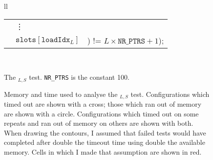 \begin{figure}
{{\begin{tabular}{ll}
\begin{tabular}{lll}
         & \vdots \\
         &\hspace{-4mm}$\texttt{slots}[\texttt{loadIdx}_L]$ &\hspace{-3mm}) != $L{\times}\texttt{NR\_PTRS} + 1$);\\
       \end{tabular}\\
    \end{tabular}
    }
  }
  {\hfill}
  {\hfill}
  \caption{The $_{L,S}$ test.
    \texttt{NR\_PTRS} is the constant 100.  }
  \label{fig:eval:why:complex_aliasing}
\end{figure}

\begin{figure}
  \caption{Memory and time used to analyse the
    $_{L,S}$ test.  Configurations which timed
    out are shown with a cross; those which ran out of memory are
    shown with a circle.  Configurations which timed out on some
    repeats and ran out of memory on others are shown with both.  When
    drawing the contours, I assumed that failed tests would have
    completed after double the timeout time using double the available
    memory.  Cells in which I made that assumption are shown in red.}
  \label{fig:eval:why:complex_aliasing:result1}
\end{figure}

